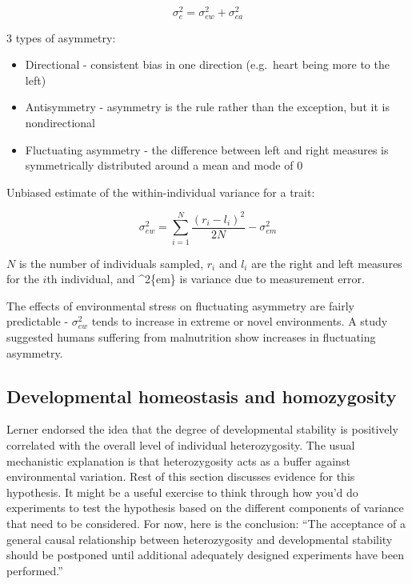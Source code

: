 \documentclass[
]{book}
\providecommand{\tightlist}{%
  \setlength{\itemsep}{0pt}\setlength{\parskip}{0pt}}
\begin{document}
\begin{equation}
  \sigma^2_{e} = \sigma^2_{ew} + \sigma^2_{ea}
  \label{eq:special-environmental-effects-variance}
\end{equation}

3 types of asymmetry:

\begin{itemize}
\tightlist
\item
  Directional - consistent bias in one direction (e.g.~heart being more to the left)
\item
  Antisymmetry - asymmetry is the rule rather than the exception, but it is nondirectional
\item
  Fluctuating asymmetry - the difference between left and right measures is symmetrically distributed around a mean and mode of 0
\end{itemize}

Unbiased estimate of the within-individual variance for a trait:

\begin{equation}
  \sigma^2_{ew} = \sum_{i=1}^{N} \frac{(r_i - l_i)^2}{2N} - \sigma^2_{em}
  \label{eq:within-individual-variance}
\end{equation}

\(N\) is the number of individuals sampled, \(r_i\) and \(l_i\) are the right and left measures for the \(i\)th individual, and \sigma\^{}2\{em\} is variance due to measurement error.

The effects of environmental stress on fluctuating asymmetry are fairly predictable - \(\sigma^2_{ew}\) tends to increase in extreme or novel environments. A study suggested humans suffering from malnutrition show increases in fluctuating asymmetry.

\hypertarget{developmental-homeostasis-and-homozygosity}{%
\subsection{Developmental homeostasis and homozygosity}\label{developmental-homeostasis-and-homozygosity}}

Lerner endorsed the idea that the degree of developmental stability is positively correlated with the overall level of individual heterozygosity. The usual mechanistic explanation is that heterozygosity acts as a buffer against environmental variation. Rest of this section discusses evidence for this hypothesis. It might be a useful exercise to think through how you'd do experiments to test the hypothesis based on the different components of variance that need to be considered. For now, here is the conclusion: ``The acceptance of a general causal relationship between heterozygosity and developmental stability should be postponed until additional adequately designed experiments have been performed.''
\end{document}
